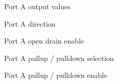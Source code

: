 \begin{DoxyItemize}
\item Port A output values ~\newline
~\newline
~\newline
~\newline
~\newline
~\newline
~\newline
~\newline
~\newline
~\newline
~\newline
~\newline
~\newline
~\newline
~\newline

\item Port A direction ~\newline
~\newline
~\newline
~\newline
~\newline
~\newline
~\newline
~\newline
~\newline
~\newline
~\newline
~\newline
~\newline
~\newline

\item Port A open drain enable ~\newline
~\newline
~\newline
~\newline
~\newline
~\newline
~\newline
~\newline
~\newline
~\newline
~\newline
~\newline
~\newline

\item Port A pullup / pulldown selection ~\newline
~\newline
~\newline
~\newline
~\newline
~\newline
~\newline
~\newline
~\newline
~\newline
~\newline
~\newline

\item Port A pullup / pulldown enable
\end{DoxyItemize}

